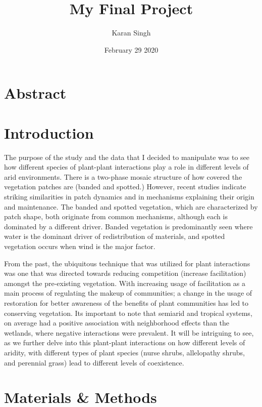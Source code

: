 \documentclass[letterpaper]{article}
\title{My Final Project}
\author{Karan Singh}
\date{February 29 2020}
\begin{document}
\maketitle
\section*{Abstract}

\newpage
\tableofcontents


\newpage
\section{Introduction}
The purpose of the study and the data that I decided to manipulate was to see how different species of plant-plant interactions play a role in different levels of arid environments. There is a two-phase mosaic structure of how covered the vegetation patches are (banded and spotted.) However, recent studies indicate striking similarities in patch dynamics and in mechanisms explaining their origin and maintenance. The banded and spotted vegetation, which are characterized by patch shape, both originate from common mechanisms, although each is dominated by a different driver. Banded vegetation is predominantly seen where water is the dominant driver of redistribution of materials, and spotted vegetation occurs when wind is the major factor.

From the past, the ubiquitous technique that was utilized for plant interactions was one that was directed towards reducing competition (increase facilitation) amongst the pre-existing vegetation. With increasing usage of facilitation as a main process of regulating the makeup of communities; a change in the usage of restoration for better awareness of the benefits of plant communities has led to conserving vegetation. Its important to note that semiarid and tropical systems, on average had a positive association with neighborhood effects than the wetlands, where negative interactions were prevalent. It will be intriguing to see, as we further delve into this plant-plant interactions on how different levels of aridity, with different types of plant species (nurse shrubs, allelopathy shrubs, and perennial grass) lead to different levels of coexistence.



\section{Materials \& Methods}
\end{document}
